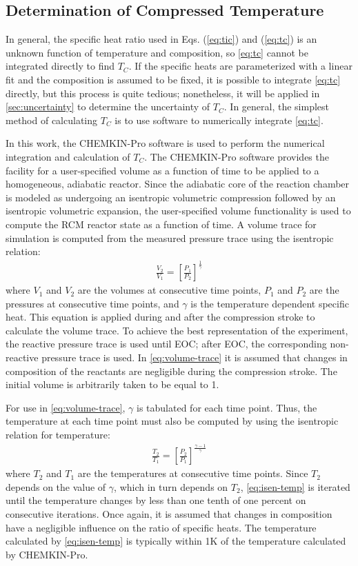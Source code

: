 \documentclass[../main.tex]{subfiles}
\begin{document}
\subsection{Determination of Compressed Temperature}

In general, the specific heat ratio used in Eqs. (\ref{eq:tic}) and
(\ref{eq:tc}) is an unknown function of temperature and composition,
so \cref{eq:tc} cannot be integrated directly to find $T_C$. If
the specific heats are parameterized with a linear fit and the
composition is assumed to be fixed, it is possible to integrate \cref{eq:tc} directly,
but this process is quite tedious; nonetheless, it will be applied in
\cref{sec:uncertainty} to determine the uncertainty of $T_C$. In
general, the simplest method of calculating $T_C$ is to use software
to numerically integrate \cref{eq:tc}.

In this work, the CHEMKIN-Pro \cite{Chemkin2012} software is used to
perform the numerical integration and calculation of $T_C$. The
CHEMKIN-Pro software provides the facility for a user-specified
volume as a function of time to be applied to a homogeneous,
adiabatic reactor. Since the adiabatic core of the reaction chamber
is modeled as undergoing an isentropic volumetric compression followed
by an isentropic volumetric expansion, the user-specified volume
functionality is used to compute the RCM reactor state as a function
of time. A volume trace for simulation is computed from the measured
pressure trace using the isentropic relation:
%
\begin{align}
\frac{V_2}{V_1} = \left[\frac{P_1}{P_2}\right]^{\frac{1}{\gamma}}
\label{eq:volume-trace}
\end{align}
%
where $V_1$ and $V_2$ are the volumes at consecutive time points,
$P_1$ and $P_2$ are the pressures at consecutive time points, and
$\gamma$ is the temperature dependent specific heat. This equation
is applied during and after the compression stroke to calculate
the volume trace. To achieve the best representation of the experiment,
the reactive pressure trace is used until EOC; after EOC, the
corresponding non-reactive pressure trace is used. In \cref{eq:volume-trace} it is assumed that
changes in composition of the reactants are negligible during the
compression stroke. The initial volume is arbitrarily taken
to be equal to 1.

For use in \cref{eq:volume-trace}, $\gamma$ is tabulated for each
time point. Thus, the temperature at each time point must also be
computed by using the isentropic relation for temperature:
%
\begin{align}
\frac{T_2}{T_1} = \left[\frac{P_2}{P_1}\right]^{\frac{\gamma-1}{\gamma}}
\label{eq:isen-temp}
\end{align}
%
where $T_2$ and $T_1$ are the temperatures at consecutive time points.
Since $T_2$ depends on the value of $\gamma$, which in turn depends
on $T_2$, \cref{eq:isen-temp} is iterated until the temperature
changes by less than one tenth of one percent on consecutive iterations.
Once again, it is assumed that changes in composition have a negligible
influence on the ratio of specific heats.
The temperature calculated by \cref{eq:isen-temp} is typically within
1K of the temperature calculated by CHEMKIN-Pro.
\end{document}
